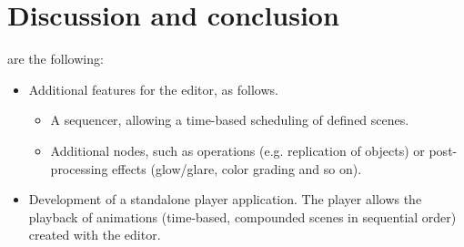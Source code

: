\documentclass[%
    a4paper,    %
    justified,  %
    nobib,      %
    openany     %
]{tufte-book}
\begin{document}
\chapter{Discussion and conclusion}
\label{chap:discussion-conclusion}




 are the following:
\begin{itemize}
  \item Additional features for the editor, as follows.
  \begin{itemize}
    \item A sequencer, allowing a time-based scheduling of defined scenes.
    \item Additional nodes, such as operations (e.g. replication of objects)
      or post-processing effects (glow/glare, color grading and so on).
  \end{itemize}
  \item Development of a standalone player application. The player allows the
    playback of animations (time-based, compounded scenes in sequential order)
    created with the editor.
\end{itemize}
\backmatter{}
\end{document}
